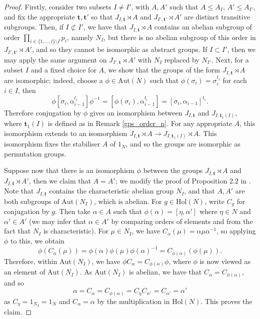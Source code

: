 \documentclass[a4paper,reqno]{amsart}
\theoremstyle{definition}
\newcommand{\bt}{\textbf{t}}
\newcommand{\Aut}{\mathrm{Aut}}
\newcommand{\Hol}{\mathrm{Hol}}
\begin{document}
\begin{proof}
    Firstly, consider two subsets $I \neq I'$, with $A,A'$ such that $A\leq A_I$, $A'\leq A_{I'}$, and fix the appropriate $\bt,\bt'$ so that $J_{I,\bt}\rtimes A$ and $J_{I',\bt'} \rtimes A'$ are distinct transitive subgroups. Then, if $I \not\subset I'$, we have that $J_{I,\bt}\rtimes A$ contains an abelian subgroup of order $\prod_{i\in \{1,\ldots, l\}\setminus I}p_i$, namely $N_I$, but there is no abelian subgroup of this order in $J_{I',\bt'}\rtimes A'$, and so they cannot be isomorphic as abstract groups. If $I \subset I'$, then we may apply the same argument on $J_{I',\bt}\rtimes A'$ with $N_I$ replaced by $N_{I'}$. Next, for a subset $I$ and a fixed choice for $A$, we show that the groups of the form $J_{I,\bt} \rtimes A$ are isomorphic; indeed, choose a $\phi \in \Aut(N)$ such that $\phi(\sigma_i)=\sigma_i^{t_i}$ for each $i \in I$, then
    \[\phi\left[\sigma_i,\alpha_{i-1}^{t_i}\right]\phi^{-1}=\left[\phi(\sigma_i),\alpha_{i-1}^{t_i}\right]=\left[\sigma_i,\alpha_{i-1}\right]^{t_i}.\]
    Therefore conjugation by $\phi$ gives an isomorphism between $J_{I,\bt}$ and $J_{I,\bt_1(I)}$, where $\bt_1(I)$ is defined as in Remark \ref{gps_order_n}. For any appropriate $A$, this isomorphism extends to an isomorphism $J_{I,\bt}\rtimes A\to J_{I,\bt_1(I)} \rtimes A$. This isomorphism fixes the stabiliser $A$ of $1_N$, and so the groups are isomorphic as permutation groups.
 
    Suppose now that there is an isomorphism $\phi$ between the groups $J_{I,\bt} \rtimes A$ and $J_{I,\bt} \rtimes A'$, then we claim that $A=A'$; we modify the proof of Proposition $2.2$ in \cite{BML21}. Note that $J_{I,\bt}$ contains the characteristic abelian group $N_I$, and that $A,A'$ are both subgroups of $\Aut(N_I)$, which is abelian. For $g \in \Hol(N)$, write $C_g$ for conjugation by $g$. Then take $\alpha \in A$ such that $\phi(\alpha)=[\eta,\alpha']$ where $\eta \in N$ and $\alpha' \in A'$ (we may infer that $\alpha \in A'$ by comparing orders of elements and from the fact that $N_I$ is characteristic). For $\mu \in N_I$, we have $C_{\alpha}(\mu)=\alpha\mu\alpha^{-1}$, so applying $\phi$ to this, we obtain
    \[\phi(C_{\alpha}(\mu))=\phi(\alpha)\phi(\mu)\phi(\alpha)^{-1}=C_{\phi(\alpha)}(\phi(\mu)).\]
    Therefore, within $\Aut(N_I)$, we have $\phi C_{\alpha} = C_{\phi(\alpha)}\phi$, where $\phi$ is now viewed as an element of $\Aut(N_I)$. As $\Aut(N_I)$ is abelian, we have that $C_{\alpha}=C_{\phi(\alpha)}$, and so
    \[\alpha=C_{\alpha}=C_{\phi(\alpha)}=C_{\eta}C_{\alpha'}=C_{\alpha'}=\alpha'\]
    as $C_{\eta}=1_{N_I}=1_N$ and $C_{\alpha}=\alpha$ by the multiplication in $\Hol(N)$. This proves the claim.
\end{proof}
\end{document}
